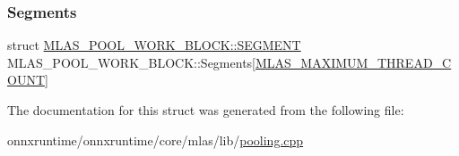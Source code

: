 \mbox{\label{structMLAS__POOL__WORK__BLOCK_aca08f4df1e834264494cef662495ad51}} 
\subsubsection{\texorpdfstring{Segments}{Segments}}
{\footnotesize\ttfamily struct \mbox{\hyperlink{structMLAS__POOL__WORK__BLOCK_1_1SEGMENT}{M\+L\+A\+S\+\_\+\+P\+O\+O\+L\+\_\+\+W\+O\+R\+K\+\_\+\+B\+L\+O\+C\+K\+::\+S\+E\+G\+M\+E\+NT}}  M\+L\+A\+S\+\_\+\+P\+O\+O\+L\+\_\+\+W\+O\+R\+K\+\_\+\+B\+L\+O\+C\+K\+::\+Segments\mbox{[}\mbox{\hyperlink{mlasi_8h_a86466d6811df85b69801ae746e3ad493}{M\+L\+A\+S\+\_\+\+M\+A\+X\+I\+M\+U\+M\+\_\+\+T\+H\+R\+E\+A\+D\+\_\+\+C\+O\+U\+NT}}\mbox{]}}



The documentation for this struct was generated from the following file\+:\begin{DoxyCompactItemize}
\item 
onnxruntime/onnxruntime/core/mlas/lib/\mbox{\hyperlink{pooling_8cpp}{pooling.\+cpp}}\end{DoxyCompactItemize}
